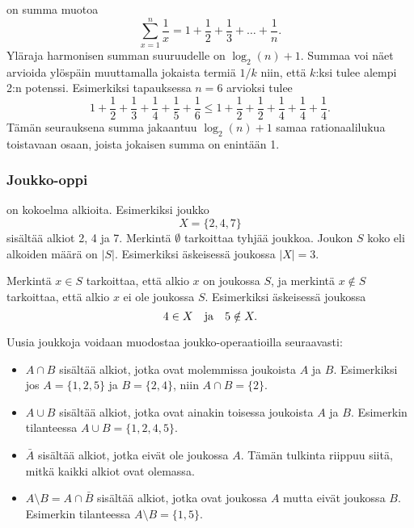\noindent
{} on summa muotoa
\[ \sum_{x=1}^n \frac{1}{x} = 1+\frac{1}{2}+\frac{1}{3}+\ldots+\frac{1}{n}.\]
Yläraja harmonisen summan suuruudelle on $\log_2(n)+1$.
Summaa voi näet arvioida ylöspäin
muuttamalla jokaista termiä $1/k$ niin,
että $k$:ksi tulee alempi 2:n potenssi.
Esimerkiksi tapauksessa $n=6$ arvioksi tulee
\[ 1+\frac{1}{2}+\frac{1}{3}+\frac{1}{4}+\frac{1}{5}+\frac{1}{6} \le
1+\frac{1}{2}+\frac{1}{2}+\frac{1}{4}+\frac{1}{4}+\frac{1}{4}.\]
Tämän seurauksena summa jakaantuu $\log_2(n)+1$ samaa
rationaalilukua toistavaan osaan, joista jokaisen summa on enintään 1.

\subsubsection{Joukko-oppi}


 on kokoelma alkioita.
Esimerkiksi joukko
\[X=\{2,4,7\}\]
sisältää alkiot 2, 4 ja 7.
Merkintä $\emptyset$ tarkoittaa tyhjää joukkoa.
Joukon $S$ koko eli alkoiden määrä on $|S|$.
Esimerkiksi äskeisessä joukossa $|X|=3$.

Merkintä $x \in S$ tarkoittaa,
että alkio $x$ on joukossa $S$,
ja merkintä $x \notin S$ tarkoittaa,
että alkio $x$ ei ole joukossa $S$.
Esimerkiksi äskeisessä joukossa
\[4 \in X \hspace{10px}\textrm{ja}\hspace{10px} 5 \notin X.\]

\begin{samepage}
Uusia joukkoja voidaan muodostaa joukko-operaatioilla
seuraavasti:
\begin{itemize}
\item {} $A \cap B$ sisältää alkiot,
jotka ovat molemmissa joukoista $A$ ja $B$.
Esimerkiksi jos $A=\{1,2,5\}$ ja $B=\{2,4\}$,
niin $A \cap B = \{2\}$.
\item {} $A \cup B$ sisältää alkiot,
jotka ovat ainakin toisessa joukoista $A$ ja $B$.
Esimerkin tilanteessa $A \cup B = \{1,2,4,5\}$.
\item {} $\bar A$ sisältää alkiot,
jotka eivät ole joukossa $A$.
Tämän tulkinta riippuu siitä, mitkä kaikki
alkiot ovat olemassa.
\item {} $A \setminus B = A \cap \bar B$ sisältää alkiot,
jotka ovat joukossa $A$ mutta eivät joukossa $B$.
Esimerkin tilanteessa $A \setminus B = \{1,5\}$.
\end{itemize}
\end{samepage}

